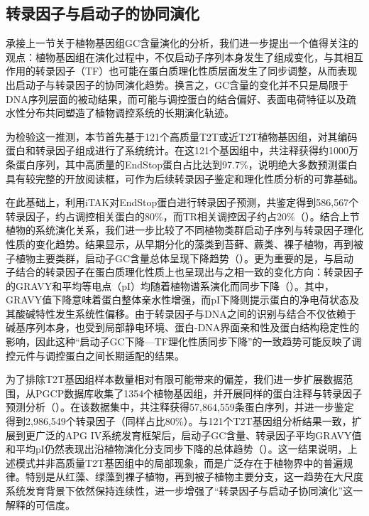\subsection{转录因子与启动子的协同演化}

承接上一节关于植物基因组GC含量演化的分析，我们进一步提出一个值得关注的观点：植物基因组在演化过程中，不仅启动子序列本身发生了组成变化，与其相互作用的转录因子（TF）也可能在蛋白质理化性质层面发生了同步调整，从而表现出启动子与转录因子的协同演化趋势。换言之，GC含量的变化并不只是局限于DNA序列层面的被动结果，而可能与调控蛋白的结合偏好、表面电荷特征以及疏水性分布共同塑造了植物调控系统的长期演化轨迹。


为检验这一推测，本节首先基于121个高质量T2T或近T2T植物基因组，对其编码蛋白和转录因子组成进行了系统统计。在这121个基因组中，共注释获得约1000万条蛋白序列，其中高质量的EndStop蛋白占比达到97.7\%，说明绝大多数预测蛋白具有较完整的开放阅读框，可作为后续转录因子鉴定和理化性质分析的可靠基础。

在此基础上，利用iTAK对EndStop蛋白进行转录因子预测\cite{zheng2016itak}，共鉴定得到586,567个转录因子，约占调控相关蛋白的80\%，而TR相关调控因子约占20\%（）。结合上节植物的系统演化关系，我们进一步比较了不同植物类群启动子序列与转录因子理化性质的变化趋势。结果显示，从早期分化的藻类到苔藓、蕨类、裸子植物，再到被子植物主要类群，启动子GC含量总体呈现下降趋势（）。更为重要的是，与启动子结合的转录因子在蛋白质理化性质上也呈现出与之相一致的变化方向：转录因子的GRAVY和平均等电点（pI）均随着植物谱系演化而同步下降（）。其中，GRAVY值下降意味着蛋白整体亲水性增强，而pI下降则提示蛋白的净电荷状态及其酸碱特性发生系统性偏移。由于转录因子与DNA之间的识别与结合不仅依赖于碱基序列本身，也受到局部静电环境、蛋白-DNA界面亲和性及蛋白结构稳定性的影响，因此这种“启动子GC下降—TF理化性质同步下降”的一致趋势可能反映了调控元件与调控蛋白之间长期适配的结果。

为了排除T2T基因组样本数量相对有限可能带来的偏差，我们进一步扩展数据范围，从PGCP数据库收集了1354个植物基因组\cite{zhou2025pgcp}，并开展同样的蛋白注释与转录因子预测分析（）。在该数据集中，共注释获得57,864,559条蛋白序列，并进一步鉴定得到2,986,549个转录因子（同样占比80\%）。与121个T2T基因组分析结果一致，扩展到更广泛的APG IV系统发育框架后，启动子GC含量、转录因子平均GRAVY值和平均pI仍然表现出沿植物演化分支同步下降的总体趋势（）。这一结果说明，上述模式并非高质量T2T基因组中的局部现象，而是广泛存在于植物界中的普遍规律。特别是从红藻、绿藻到裸子植物，再到被子植物主要分支，这一趋势在大尺度系统发育背景下依然保持连续性，进一步增强了“转录因子与启动子协同演化”这一解释的可信度。

